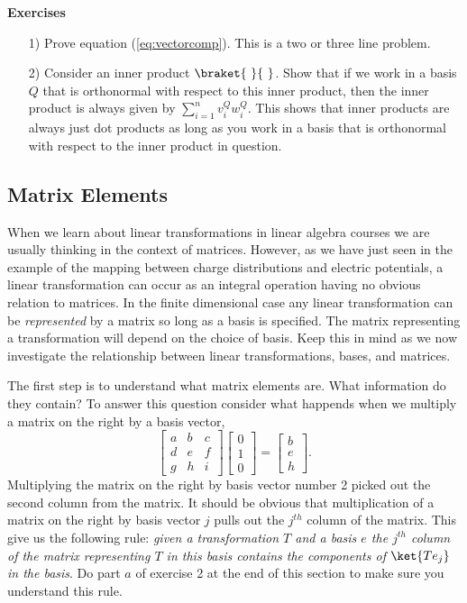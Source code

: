 \begin{flushleft}\textbf{Exercises}\end{flushleft}
\begin{itemize}
\item[1)] Prove equation (\ref{eq:vectorcomp}).  This is a two or three line problem.
\item[2)] Consider an inner product $\braket{~}{~}$.  Show that if we work in a basis $Q$ that is orthonormal with respect to this inner product, then the inner product is always given by $\sum_{i=1}^n v_i^Q w_i^Q$.  This shows that inner products are always just dot products as long as you work in a basis that is orthonormal with respect to the inner product in question.
\end{itemize}

\subsection{Matrix Elements}
When we learn about linear transformations in linear algebra courses we are usually thinking in the context of matrices.  However, as we have just seen in the example of the mapping between charge distributions and electric potentials, a linear transformation can occur as an integral operation having no obvious relation to matrices.  In the finite dimensional case any linear transformation can be \emph{represented} by a matrix so long as a basis is specified.  The matrix representing a transformation will depend on the choice of basis.  Keep this in mind as we now investigate the relationship between linear transformations, bases, and matrices.

The first step is to understand what matrix elements are.  What information do they contain?  To answer this question consider what happends when we multiply a matrix on the right by a basis vector,
\begin{displaymath}\left[ \begin{array}{ccc} a&b&c\\d&e&f\\g&h&i \end{array} \right] \left[ \begin{array}{c} 0\\1\\0 \end{array} \right] = \left[ \begin{array}{c} b\\e\\h \end{array} \right]. \end{displaymath}
Multiplying the matrix on the right by basis vector number 2 picked out the second column from the matrix.  It should be obvious that multiplication of a matrix on the right by basis vector $j$ pulls out the $j^{th}$ column of the matrix.  This give us the following rule: \emph{given a transformation $T$ and a basis $e$ the $j^{th}$ column of the matrix representing $T$ in this basis contains the components of $\ket{Te_j}$ in the basis}.  Do part $a$ of exercise 2 at the end of this section to make sure you understand this rule.

